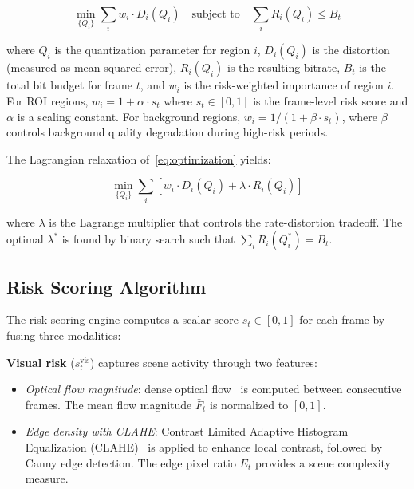 \begin{equation}
\label{eq:optimization}
\min_{\{Q_i\}} \sum_{i} w_i \cdot D_i(Q_i) \quad \text{subject to} \quad \sum_{i} R_i(Q_i) \leq B_t
\end{equation}

where $Q_i$ is the quantization parameter for region $i$, $D_i(Q_i)$ is the distortion (measured as mean squared error), $R_i(Q_i)$ is the resulting bitrate, $B_t$ is the total bit budget for frame $t$, and $w_i$ is the risk-weighted importance of region $i$. For ROI regions, $w_i = 1 + \alpha \cdot s_t$ where $s_t \in [0, 1]$ is the frame-level risk score and $\alpha$ is a scaling constant. For background regions, $w_i = 1 / (1 + \beta \cdot s_t)$, where $\beta$ controls background quality degradation during high-risk periods.

The Lagrangian relaxation of~\eqref{eq:optimization} yields:

\begin{equation}
\label{eq:lagrangian}
\min_{\{Q_i\}} \sum_{i} \left[ w_i \cdot D_i(Q_i) + \lambda \cdot R_i(Q_i) \right]
\end{equation}

where $\lambda$ is the Lagrange multiplier that controls the rate-distortion tradeoff. The optimal $\lambda^*$ is found by binary search such that $\sum_i R_i(Q_i^*) = B_t$.

\subsection{Risk Scoring Algorithm}
\label{sec:risk_scoring}

The risk scoring engine computes a scalar score $s_t \in [0, 1]$ for each frame by fusing three modalities:

\textbf{Visual risk} ($s_t^{\text{vis}}$) captures scene activity through two features:
\begin{itemize}
    \item \emph{Optical flow magnitude}: dense optical flow~\cite{farneback2003two} is computed between consecutive frames. The mean flow magnitude $\bar{F}_t$ is normalized to $[0, 1]$.
    \item \emph{Edge density with CLAHE}: Contrast Limited Adaptive Histogram Equalization (CLAHE)~\cite{zuiderveld1994contrast} is applied to enhance local contrast, followed by Canny edge detection. The edge pixel ratio $E_t$ provides a scene complexity measure.
\end{itemize}

